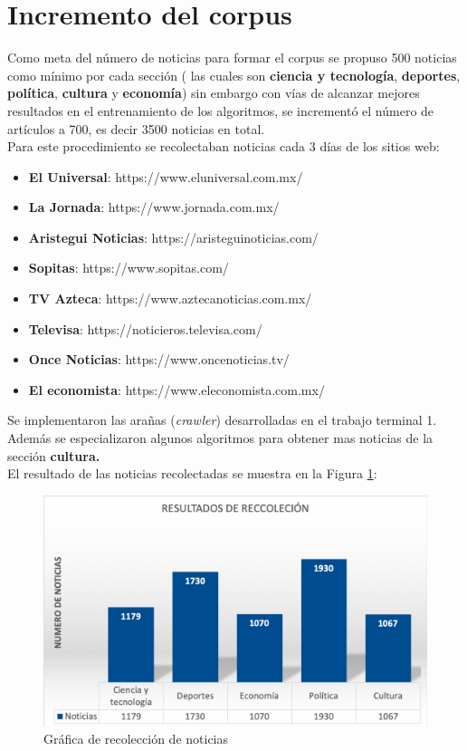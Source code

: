 \section{Incremento del corpus}

Como meta del número de noticias para formar el corpus se propuso 500 noticias como mínimo por cada sección ( las cuales son \textbf{ciencia y tecnología}, \textbf{deportes}, \textbf{política}, \textbf{cultura} y \textbf{economía}) sin embargo con vías de alcanzar mejores resultados en el entrenamiento de los algoritmos, se incrementó el número de artículos a 700, es decir 3500 noticias en total.\\

Para este procedimiento se recolectaban noticias cada 3 días de los sitios web:

\begin{itemize}
	  \item \textbf{El Universal}: https://www.eluniversal.com.mx/
      \item \textbf{La Jornada}: https://www.jornada.com.mx/
	  \item \textbf{Aristegui Noticias}: https://aristeguinoticias.com/
	  \item \textbf{Sopitas}: https://www.sopitas.com/
      \item \textbf{TV Azteca}: https://www.aztecanoticias.com.mx/
      \item \textbf{Televisa}: https://noticieros.televisa.com/
      \item \textbf{Once Noticias}: https://www.oncenoticias.tv/
      \item \textbf{El economista}: https://www.eleconomista.com.mx/
\end{itemize}

Se implementaron las arañas (\textit{crawler}) desarrolladas en el trabajo terminal 1. Además se especializaron algunos algoritmos para obtener mas noticias de la sección \textbf{cultura.}\\

El resultado de las noticias recolectadas se muestra en la Figura \ref{fig:recoleccion}:

\begin{figure}[ht]
\centering
\includegraphics[scale=0.35]{imagenes/Resultados/Recoleccion.png}
\caption{Gráfica de recolección de noticias}
\label{fig:recoleccion}
\end{figure}

